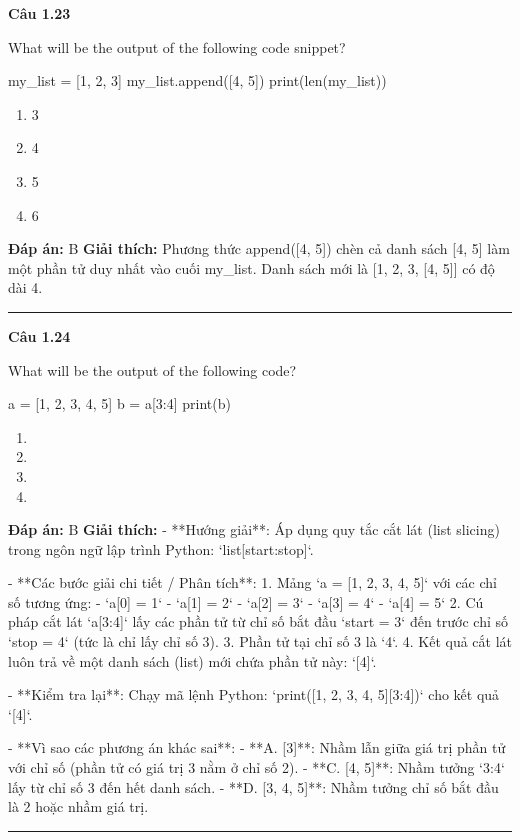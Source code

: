\documentclass[11pt,a4paper]{article}
\newenvironment{question}[1]{%
  \par\vspace{1em}\noindent\textbf{\large Câu #1}\par\vspace{0.4em}
}{%
  \par\vspace{1em}\hrule\vspace{0.6em}
}
\newenvironment{choices}{%
  \begin{enumerate}[label=\textbf{\Alph*.},leftmargin=2.2em,itemsep=2pt,topsep=3pt]
}{%
  \end{enumerate}
}
\newcommand{\choice}{\item}
\newenvironment{codebox}{%
  \begin{tcolorbox}[colback=gray!8!white,colframe=gray!50!black,arc=1.5mm,boxrule=0.6pt,left=3mm,right=3mm,top=2.5mm,bottom=2.5mm]
  \ttfamily\small
}{%
  \end{tcolorbox}
}
\begin{document}
\begin{question}{1.23}
What will be the output of the following code snippet?
\begin{codebox}
my_list = [1, 2, 3]
my_list.append([4, 5])
print(len(my_list))
\end{codebox}
\begin{choices}
\choice 3
\choice 4
\choice 5
\choice 6
\end{choices}
\textbf{Đáp án:} B
\textbf{Giải thích:} Phương thức append([4, 5]) chèn cả danh sách [4, 5] làm một phần tử duy nhất vào cuối my_list. Danh sách mới là [1, 2, 3, [4, 5]] có độ dài 4.
\end{question}

\begin{question}{1.24}
What will be the output of the following code?
\begin{codebox}
a = [1, 2, 3, 4, 5]
b = a[3:4]
print(b)
\end{codebox}
\begin{choices}
\choice [3]
\choice [4]
\choice [4, 5]
\choice [3, 4, 5]
\end{choices}
\textbf{Đáp án:} B
\textbf{Giải thích:} - **Hướng giải**:
  Áp dụng quy tắc cắt lát (list slicing) trong ngôn ngữ lập trình Python: `list[start:stop]`.

- **Các bước giải chi tiết / Phân tích**:
  1. Mảng `a = [1, 2, 3, 4, 5]` với các chỉ số tương ứng:
     - `a[0] = 1`
     - `a[1] = 2`
     - `a[2] = 3`
     - `a[3] = 4`
     - `a[4] = 5`
  2. Cú pháp cắt lát `a[3:4]` lấy các phần tử từ chỉ số bắt đầu `start = 3` đến trước chỉ số `stop = 4` (tức là chỉ lấy chỉ số 3).
  3. Phần tử tại chỉ số 3 là `4`.
  4. Kết quả cắt lát luôn trả về một danh sách (list) mới chứa phần tử này: `[4]`.

- **Kiểm tra lại**:
  Chạy mã lệnh Python: `print([1, 2, 3, 4, 5][3:4])` cho kết quả `[4]`.

- **Vì sao các phương án khác sai**:
  - **A. [3]**: Nhầm lẫn giữa giá trị phần tử với chỉ số (phần tử có giá trị 3 nằm ở chỉ số 2).
  - **C. [4, 5]**: Nhầm tưởng `3:4` lấy từ chỉ số 3 đến hết danh sách.
  - **D. [3, 4, 5]**: Nhầm tưởng chỉ số bắt đầu là 2 hoặc nhầm giá trị.
\end{question}
\end{document}
